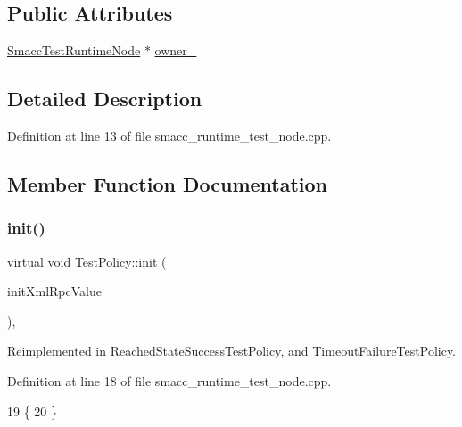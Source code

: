 \subsection*{Public Attributes}
\begin{DoxyCompactItemize}
\item 
\hyperlink{classSmaccTestRuntimeNode}{Smacc\+Test\+Runtime\+Node} $\ast$ \hyperlink{classTestPolicy_a717c3e59e35216a175398b85575aec43}{owner\+\_\+}
\end{DoxyCompactItemize}


\subsection{Detailed Description}


Definition at line 13 of file smacc\+\_\+runtime\+\_\+test\+\_\+node.\+cpp.



\subsection{Member Function Documentation}
\mbox{\label{classTestPolicy_a43d28339f108860503ef66ce4692596d}} 
\subsubsection{\texorpdfstring{init()}{init()}}
{\footnotesize\ttfamily virtual void Test\+Policy\+::init (\begin{DoxyParamCaption}\item[{Xml\+Rpc\+::\+Xml\+Rpc\+Value \&}]{init\+Xml\+Rpc\+Value }\end{DoxyParamCaption})\hspace{0.3cm}{\ttfamily [inline]}, {\ttfamily [virtual]}}



Reimplemented in \hyperlink{classReachedStateSuccessTestPolicy_a2a3e598a103fcad64d7a6546c56a0fdd}{Reached\+State\+Success\+Test\+Policy}, and \hyperlink{classTimeoutFailureTestPolicy_ab37fd803fdd79d989a6fdf58d3473b87}{Timeout\+Failure\+Test\+Policy}.



Definition at line 18 of file smacc\+\_\+runtime\+\_\+test\+\_\+node.\+cpp.


\begin{DoxyCode}
19   \{
20   \}
\end{DoxyCode}
\mbox{\label{classTestPolicy_ae7a8f2ef3c4d513122ad20d5cffc88db}} 
